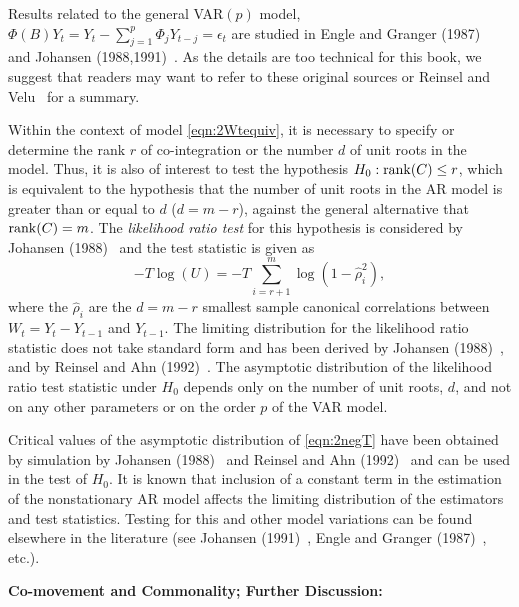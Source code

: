 Results related to the general VAR$(p)$ model, $\Phi(B) Y_t = Y_t - \sum_{j=1}^p \Phi_j Y_{t-j} = \epsilon_t$ are studied in Engle and Granger (1987)~\cite{engle1987co} and Johansen (1988,1991)~\cite{johansen1988statistical,johansen1991estimation}. As the details are too technical for this book, we suggest that readers may want to refer to these original sources or Reinsel and Velu~\cite{velurein} for a summary.
 

Within the context of model \eqref{eqn:2Wtequiv}, it is necessary to specify or determine the rank $r$ of co-integration or the number $d$ of unit roots in the model. Thus, it is also of interest to test the hypothesis $H_0: \operatorname{rank}(C) \leq r$, which is equivalent to the hypothesis that the number of unit roots in the AR model is greater than or equal to $d$ ($d = m - r$), against the general alternative that $\operatorname{rank}(C) = m$.  The \emph{likelihood ratio test} for this hypothesis is considered by Johansen (1988)~\cite{johansen1988statistical} and the test statistic is given as 
	\begin{equation} \label{eqn:2negT}
	- T \log (U) = - T \sum_{i=r+1}^m \log ( 1 - \hat{\rho}_i^2 ),
	\end{equation}
where the $\hat{\rho}_i$ are the $d = m - r$ smallest sample canonical correlations between $W_t = Y_t - Y_{t-1}$ and $Y_{t-1}$. The limiting distribution for the likelihood ratio statistic does not take standard form and has been derived by Johansen (1988)~\cite{johansen1988statistical}, and by Reinsel and Ahn (1992)~\cite{reinsel1992vector}. The asymptotic distribution of the likelihood ratio test statistic under $H_0$ depends only on the number of unit roots, $d$, and not on any other parameters or on the order $p$ of the VAR model.


Critical values of the asymptotic distribution of \eqref{eqn:2negT} have been obtained by simulation by Johansen (1988)~\cite{johansen1988statistical} and Reinsel and Ahn (1992)~\cite{reinsel1992vector} and can be used in the test of $H_0$. It is known that inclusion of a constant term in the estimation of the nonstationary AR model affects the limiting distribution of the estimators and test statistics. Testing for this and other model variations can be found elsewhere in the literature (see Johansen (1991)~\cite{johansen1991estimation}, Engle and Granger (1987)~\cite{engle1987co}, etc.). \twomedskip


\noindent \textbf{Co-movement and Commonality; Further Discussion:} \twomedskip


